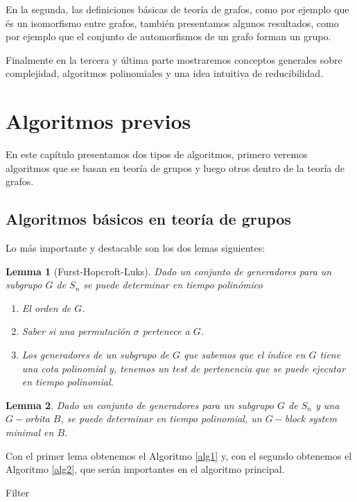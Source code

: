 \documentclass[12pt,a4paper]{book}
\theoremstyle{plain}
\newtheorem{lema}{Lemma}
\theoremstyle{definition}
\theoremstyle{remark}
\begin{document}
En la segunda, las  definiciones básicas de teoría de grafos, como por ejemplo que és un isomorfismo entre grafos, 
también presentamos algunos resultados, como por ejemplo  que el conjunto de automorfismos de un grafo forman un grupo. 

Finalmente en la tercera y última parte mostraremos conceptos generales  sobre complejidad,  algoritmos polinomiales y una idea intuitiva 
de reducibilidad.

\section*{Algoritmos previos}
En este capítulo presentamos dos tipos de algoritmos, primero veremos algoritmos que se basan en teoría de grupos y luego  
otros dentro de la teoría de grafos.

\subsection*{Algoritmos básicos en teoría de grupos}
Lo más importante y destacable  son los dos lemas siguientes:

\begin{lema}[Furst-Hopcroft-Luks]
Dado un conjunto de generadores para un subgrupo $G$ de $S_n$ se puede determinar en tiempo polinómico
\begin{enumerate}
 \item El orden de $G$.
 \item Saber si una permutación $\sigma$ pertenece a $G$.
 \item Los generadores de un subgrupo de $G$ que sabemos que el índice en $G$ tiene una cota polinomial y,  tenemos un test de 
 pertenencia que se puede ejecutar en tiempo polinomial.
\end{enumerate}
\end{lema}

\begin{lema}
 Dado  un conjunto de generadores para un subgrupo $G$ de $S_n$ y una $G-$orbita $B$, se puede determinar en tiempo polinomial, 
un $G-$block system minimal en $B$. 
\end{lema}

Con el primer lema obtenemos el Algoritmo \ref{alg1} y,  con el segundo obtenemos el Algoritmo \ref{alg2}, que serán importantes en 
el algoritmo principal.

\begin{algorithm}\label{alg1}\hypertarget{alg1}{}
 
\caption{Filter}

\end{algorithm}
\end{document}
